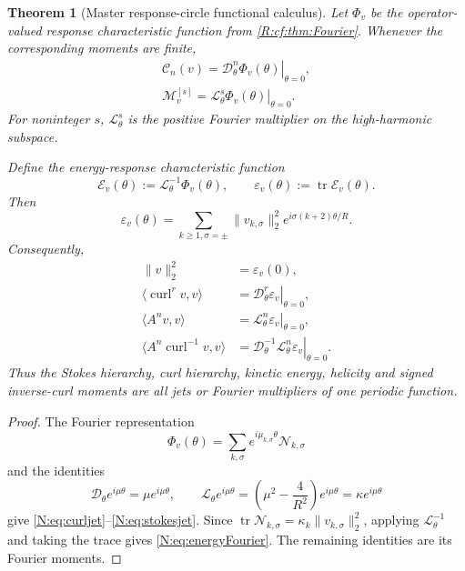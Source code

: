 \documentclass[
 aps,
 prd,
 reprint,
 amsmath,
 amssymb,
 nofootinbib,
 superscriptaddress
]{revtex4-2}
\newtheorem{theorem}{Theorem}[section]
\theoremstyle{definition}
\theoremstyle{remark}
\newcommand{\cM}{\mathscr M}
\newcommand{\cC}{\mathscr C}
\newcommand{\cN}{\mathscr N}
\newcommand{\curl}{\operatorname{curl}}
\newcommand{\tr}{\operatorname{tr}}
\begin{document}
\begin{theorem}[Master response-circle functional calculus]
\label{N:thm:mastercircle}
Let \(\Phi_v\) be the operator-valued response characteristic function from
\cref{R:cf:thm:Fourier}.  Whenever the corresponding moments are finite,
\begin{align}
 \boxed{
 \cC_n(v)
 =
 \left.
 \mathscr D_\theta^n\Phi_v(\theta)
 \right|_{\theta=0},
 }
 \label{N:eq:curljet}\\
 \boxed{
 \cM_v^{[s]}
 =
 \left.
 \mathscr L_\theta^s\Phi_v(\theta)
 \right|_{\theta=0}.
 }
 \label{N:eq:stokesjet}
\end{align}
For noninteger \(s\), \(\mathscr L_\theta^s\) is the positive Fourier
multiplier on the high-harmonic subspace.

Define the energy-response characteristic function
\begin{equation}
 \mathscr E_v(\theta)
 :=
 \mathscr L_\theta^{-1}\Phi_v(\theta),
 \qquad
 \varepsilon_v(\theta)
 :=
 \tr\mathscr E_v(\theta).
 \label{N:eq:energycircle}
\end{equation}
Then
\begin{equation}
 \boxed{
 \varepsilon_v(\theta)
 =
 \sum_{k\ge1,\sigma=\pm}
 \|v_{k,\sigma}\|_2^2
 e^{i\sigma(k+2)\theta/R}.
 }
 \label{N:eq:energyFourier}
\end{equation}
Consequently,
\begin{align}
 \|v\|_2^2
 &=
 \varepsilon_v(0),
 \label{N:eq:energyat0}\\
 \langle \curl^r v,v\rangle
 &=
 \left.
 \mathscr D_\theta^r\varepsilon_v
 \right|_{\theta=0},
 \label{N:eq:curlmomenergy}\\
 \langle A^n v,v\rangle
 &=
 \left.
 \mathscr L_\theta^n\varepsilon_v
 \right|_{\theta=0},
 \label{N:eq:stokemomenergy}\\
 \langle A^n\curl^{-1}v,v\rangle
 &=
 \left.
 \mathscr D_\theta^{-1}
 \mathscr L_\theta^n\varepsilon_v
 \right|_{\theta=0}.
 \label{N:eq:signedmomenergy}
\end{align}
Thus the Stokes hierarchy, curl hierarchy, kinetic energy, helicity and
signed inverse-curl moments are all jets or Fourier multipliers of one
periodic function.
\end{theorem}

\begin{proof}
The Fourier representation
\[
 \Phi_v(\theta)
 =
 \sum_{k,\sigma}
 e^{i\mu_{k,\sigma}\theta}\cN_{k,\sigma}
\]
and the identities
\[
 \mathscr D_\theta e^{i\mu\theta}
 =
 \mu e^{i\mu\theta},
 \qquad
 \mathscr L_\theta e^{i\mu\theta}
 =
 \left(\mu^2-\frac4{R^2}\right)e^{i\mu\theta}
 =
 \kappa e^{i\mu\theta}
\]
give \eqref{N:eq:curljet}--\eqref{N:eq:stokesjet}.
Since
\(\tr\cN_{k,\sigma}=\kappa_k\|v_{k,\sigma}\|_2^2\),
applying \(\mathscr L_\theta^{-1}\) and taking the trace gives
\eqref{N:eq:energyFourier}.  The remaining identities are its Fourier
moments.
\end{proof}
\end{document}
